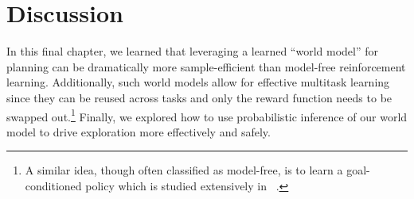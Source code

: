 \section*{Discussion}

In this final chapter, we learned that leveraging a learned ``world model'' for planning can be dramatically more sample-efficient than model-free reinforcement learning.
Additionally, such world models allow for effective multitask learning since they can be reused across tasks and only the reward function needs to be swapped out.\footnote{A similar idea, though often classified as model-free, is to learn a goal-conditioned policy which is studied extensively in ~\citep{andrychowicz2017hindsight,plappert2018multi,park2024ogbench}.}
Finally, we explored how to use probabilistic inference of our world model to drive exploration more effectively and safely.

\excheading

